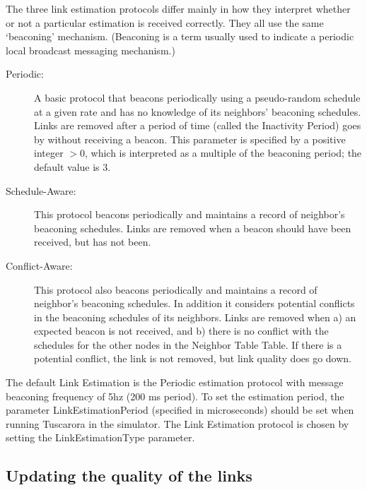 The three link estimation protocols differ mainly in how they
interpret whether or not a particular estimation is received
correctly.  They all use the same `beaconing' mechanism.
(Beaconing is a term usually used to indicate a periodic local broadcast messaging
mechanism.)

\begin{description}
  \item[Periodic:] A basic protocol that beacons periodically using a
    pseudo-random schedule at a given rate and has no knowledge of its
    neighbors' beaconing schedules. Links are removed after a period
    of time (called the Inactivity Period) goes by without receiving a
    beacon.  This parameter is specified by a positive integer $> 0$, which
    is interpreted as a multiple of the beaconing period; the
    default value is 3. 
  \item[Schedule-Aware:] This protocol beacons periodically and maintains a record of neighbor's beaconing schedules. Links are removed when a beacon should have been received, but has not been.
  \item[Conflict-Aware:] This protocol also beacons periodically and
    maintains a record of neighbor's beaconing schedules. In addition it
    considers potential conflicts in the beaconing schedules of its
    neighbors. Links are removed when a) an expected beacon is not
    received, and b) there is no conflict with the schedules for the
    other nodes in the Neighbor Table  %
                                Table.
    If there is a potential conflict, the link is not removed, but
    link quality does go down.
\end{description}

The default Link Estimation is the Periodic estimation protocol with
message beaconing frequency of 5hz (200 ms period). To set the estimation
period, the parameter LinkEstimationPeriod (specified in microseconds)
should be set when running Tuscarora in the simulator. The Link
Estimation protocol is chosen by setting the LinkEstimationType
parameter.

\subsection{Updating the quality of the links}

